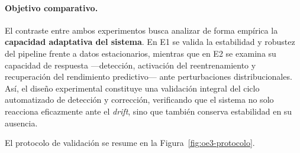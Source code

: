 \paragraph{Objetivo comparativo.}  
El contraste entre ambos experimentos busca analizar de forma empírica la \textbf{capacidad adaptativa del sistema}.  
En E1 se valida la estabilidad y robustez del pipeline frente a datos estacionarios, mientras que en E2 se examina su capacidad de respuesta —detección, activación del reentrenamiento y recuperación del rendimiento predictivo— ante perturbaciones distribucionales.  
Así, el diseño experimental constituye una validación integral del ciclo automatizado de detección y corrección, verificando que el sistema no solo reacciona eficazmente ante el \textit{drift}, sino que también conserva estabilidad en su ausencia.

El protocolo de validación se resume en la Figura~\ref{fig:oe3-protocolo}.

